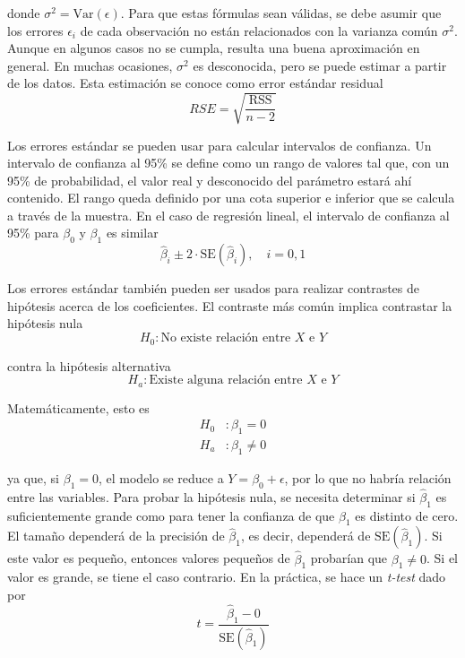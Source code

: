 \noindent donde $\sigma^2 = \text{Var}(\epsilon)$. Para que estas fórmulas sean válidas, se debe asumir que los errores $\epsilon_i$ de cada observación no están relacionados con la varianza común $\sigma^2$. Aunque en algunos casos no se cumpla, resulta una buena aproximación en general. En muchas ocasiones, $\sigma^2$ es desconocida, pero se puede estimar a partir de los datos. Esta estimación se conoce como error estándar residual
\begin{equation}
RSE = \sqrt{\frac{\text{RSS}}{n-2}}
\end{equation}

Los errores estándar se pueden usar para calcular intervalos de confianza. Un intervalo de confianza al 95\% se define como un rango de valores tal que, con un 95\% de probabilidad, el valor real y desconocido del parámetro estará ahí contenido. El rango queda definido por una cota superior e inferior que se calcula a través de la muestra. En el caso de regresión lineal, el intervalo de confianza al 95\% para $\beta_0$ y $\beta_1$ es similar
\begin{equation}
\hat{\beta}_i \pm 2 \cdot \text{SE}(\hat{\beta}_i), \quad i = 0, 1
\end{equation}

Los errores estándar también pueden ser usados para realizar contrastes de hipótesis acerca de los coeficientes. El contraste más común implica contrastar la hipótesis nula 
\begin{equation}
H_0 : \text{No existe relación entre } X \text{ e } Y
\end{equation}

\noindent contra la hipótesis alternativa 
\begin{equation}
H_a : \text{Existe alguna relación entre } X \text{ e } Y
\end{equation}

\noindent Matemáticamente, esto es 
\begin{align}
H_0 &: \beta_1 = 0 \\
H_a &: \beta_1 \neq 0
\end{align}

ya que, si $\beta_1 = 0$, el modelo se reduce a $Y = \beta_0 + \epsilon$, por lo que no habría relación entre las variables. Para probar la hipótesis nula, se necesita determinar si $\hat{\beta}_1$ es suficientemente grande como para tener la confianza de que $\beta_1$ es distinto de cero. El tamaño dependerá de la precisión de $\hat{\beta}_1$, es decir, dependerá de $\text{SE}(\hat{\beta}_1)$. Si este valor es pequeño, entonces valores pequeños de $\hat{\beta}_1$ probarían que $\beta_1 \neq 0$. Si el valor es grande, se tiene el caso contrario. En la práctica, se hace un \textit{t-test} dado por 
\begin{equation}
t = \frac{\hat{\beta}_1 - 0}{\text{SE}(\hat{\beta}_1)}
\end{equation}

